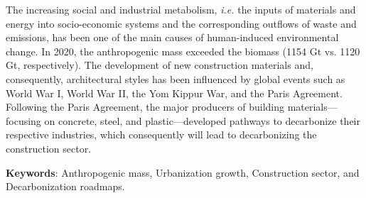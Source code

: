 The increasing social and industrial metabolism, \textit{i.e.} the inputs of materials and energy into socio-economic systems and the corresponding outflows of waste and emissions, has been one of the main causes of human-induced environmental change. In 2020, the anthropogenic mass exceeded the biomass (1154 Gt vs. 1120 Gt, respectively). The development of new construction materials and, consequently, architectural styles has been influenced by global events such as World War I, World War II, the Yom Kippur War, and the Paris Agreement. Following the Paris Agreement, the major producers of building materials—focusing on concrete, steel, and plastic—developed pathways to decarbonize their respective industries, which consequently will lead to decarbonizing the construction sector. 



\vfill

\textbf{Keywords}: Anthropogenic mass, Urbanization growth, Construction sector, and Decarbonization roadmaps.


